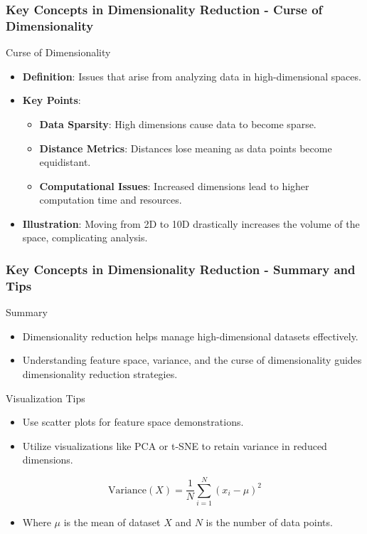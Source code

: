 \documentclass[aspectratio=169]{beamer}
\begin{document}
\begin{frame}[fragile]
    \frametitle{Key Concepts in Dimensionality Reduction - Curse of Dimensionality}
    \begin{block}{Curse of Dimensionality}
        \begin{itemize}
            \item \textbf{Definition}: Issues that arise from analyzing data in high-dimensional spaces. 
            \item \textbf{Key Points}:
                \begin{itemize}
                    \item \textbf{Data Sparsity}: High dimensions cause data to become sparse.
                    \item \textbf{Distance Metrics}: Distances lose meaning as data points become equidistant.
                    \item \textbf{Computational Issues}: Increased dimensions lead to higher computation time and resources.
                \end{itemize}
            \item \textbf{Illustration}: Moving from 2D to 10D drastically increases the volume of the space, complicating analysis.
        \end{itemize}
    \end{block}
\end{frame}

\begin{frame}[fragile]
    \frametitle{Key Concepts in Dimensionality Reduction - Summary and Tips}
    \begin{block}{Summary}
        \begin{itemize}
            \item Dimensionality reduction helps manage high-dimensional datasets effectively.
            \item Understanding feature space, variance, and the curse of dimensionality guides dimensionality reduction strategies.
        \end{itemize}
    \end{block}
    
    \begin{block}{Visualization Tips}
        \begin{itemize}
            \item Use scatter plots for feature space demonstrations.
            \item Utilize visualizations like PCA or t-SNE to retain variance in reduced dimensions.
        \end{itemize}
    \end{block}
    
    \begin{equation}
        \text{Variance} (X) = \frac{1}{N} \sum_{i=1}^{N}(x_i - \mu)^2
    \end{equation}
    \begin{itemize}
        \item Where \( \mu \) is the mean of dataset \( X \) and \( N \) is the number of data points.
    \end{itemize}
\end{frame}
\end{document}

